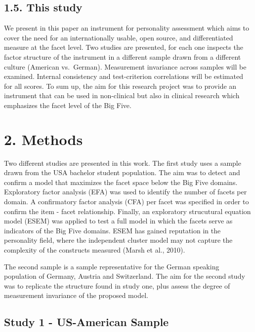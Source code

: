 \documentclass[,man]{apa6}
\theoremstyle{definition}
\theoremstyle{definition}
\theoremstyle{definition}
\theoremstyle{remark}
\begin{document}
\hypertarget{this-study}{%
\subsection{1.5. This study}\label{this-study}}

We present in this paper an instrument for personality assessment which
aims to cover the need for an internationally usable, open source, and
differentiated measure at the facet level. Two studies are presented,
for each one inspects the factor structure of the instrument in a
different sample drawn from a different culture (American vs.~German).
Measurement invariance across samples will be examined. Internal
consistency and test-criterion correlations will be estimated for all
scores. To sum up, the aim for this research project was to provide an
instrument that can be used in non-clinical but also in clinical
research which emphasizes the facet level of the Big Five.

\hypertarget{methods}{%
\section{2. Methods}\label{methods}}

Two different studies are presented in this work. The first study uses a
sample drawn from the USA bachelor student population. The aim was to
detect and confirm a model that maximizes the facet space below the Big
Five domains. Exploratory factor analysis (EFA) was used to identify the
number of facets per domain. A confirmatory factor analysis (CFA) per
facet was specified in order to confirm the item - facet relationship.
Finally, an exploratory strucutural equation model (ESEM) was applied to
test a full model in which the facets serve as indicators of the Big
Five domains. ESEM has gained reputation in the personality field, where
the independent cluster model may not capture the complexity of the
constructs measured (Marsh et al., 2010).

The second sample is a sample representative for the German speaking
population of Germany, Austria and Switzerland. The aim for the second
study was to replicate the structure found in study one, plus assess the
degree of measurement invariance of the proposed model.

\hypertarget{study-1---us-american-sample}{%
\subsection{Study 1 - US-American
Sample}\label{study-1---us-american-sample}}
\end{document}
